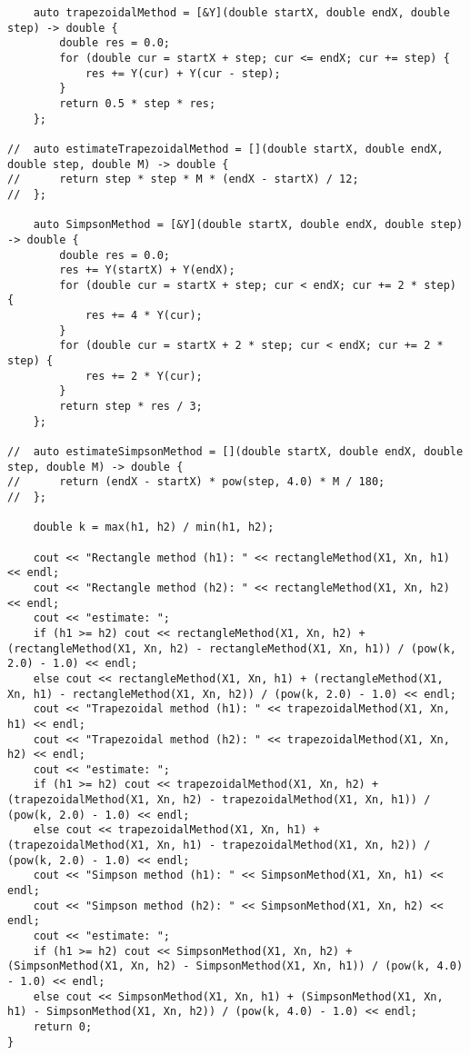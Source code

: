 \begin{lstlisting}
	auto trapezoidalMethod = [&Y](double startX, double endX, double step) -> double {
		double res = 0.0;
		for (double cur = startX + step; cur <= endX; cur += step) {
			res += Y(cur) + Y(cur - step);
		}
		return 0.5 * step * res;
	};

//	auto estimateTrapezoidalMethod = [](double startX, double endX, double step, double M) -> double {
//		return step * step * M * (endX - startX) / 12;
//	};

	auto SimpsonMethod = [&Y](double startX, double endX, double step) -> double {
		double res = 0.0;
		res += Y(startX) + Y(endX);
		for (double cur = startX + step; cur < endX; cur += 2 * step) {
			res += 4 * Y(cur);
		}
		for (double cur = startX + 2 * step; cur < endX; cur += 2 * step) {
			res += 2 * Y(cur);
		}
		return step * res / 3;
	};

//	auto estimateSimpsonMethod = [](double startX, double endX, double step, double M) -> double {
//		return (endX - startX) * pow(step, 4.0) * M / 180;
//	};

	double k = max(h1, h2) / min(h1, h2);

	cout << "Rectangle method (h1): " << rectangleMethod(X1, Xn, h1) << endl;
	cout << "Rectangle method (h2): " << rectangleMethod(X1, Xn, h2) << endl;
	cout << "estimate: ";
	if (h1 >= h2) cout << rectangleMethod(X1, Xn, h2) + (rectangleMethod(X1, Xn, h2) - rectangleMethod(X1, Xn, h1)) / (pow(k, 2.0) - 1.0) << endl;
	else cout << rectangleMethod(X1, Xn, h1) + (rectangleMethod(X1, Xn, h1) - rectangleMethod(X1, Xn, h2)) / (pow(k, 2.0) - 1.0) << endl;
	cout << "Trapezoidal method (h1): " << trapezoidalMethod(X1, Xn, h1) << endl;
	cout << "Trapezoidal method (h2): " << trapezoidalMethod(X1, Xn, h2) << endl;
	cout << "estimate: ";	
	if (h1 >= h2) cout << trapezoidalMethod(X1, Xn, h2) + (trapezoidalMethod(X1, Xn, h2) - trapezoidalMethod(X1, Xn, h1)) / (pow(k, 2.0) - 1.0) << endl;
	else cout << trapezoidalMethod(X1, Xn, h1) + (trapezoidalMethod(X1, Xn, h1) - trapezoidalMethod(X1, Xn, h2)) / (pow(k, 2.0) - 1.0) << endl;
	cout << "Simpson method (h1): " << SimpsonMethod(X1, Xn, h1) <<  endl;	
	cout << "Simpson method (h2): " << SimpsonMethod(X1, Xn, h2) <<  endl;	
	cout << "estimate: ";	
	if (h1 >= h2) cout << SimpsonMethod(X1, Xn, h2) + (SimpsonMethod(X1, Xn, h2) - SimpsonMethod(X1, Xn, h1)) / (pow(k, 4.0) - 1.0) << endl;
	else cout << SimpsonMethod(X1, Xn, h1) + (SimpsonMethod(X1, Xn, h1) - SimpsonMethod(X1, Xn, h2)) / (pow(k, 4.0) - 1.0) << endl;	
	return 0;
}
\end{lstlisting}
\vspace{0.5cm}

